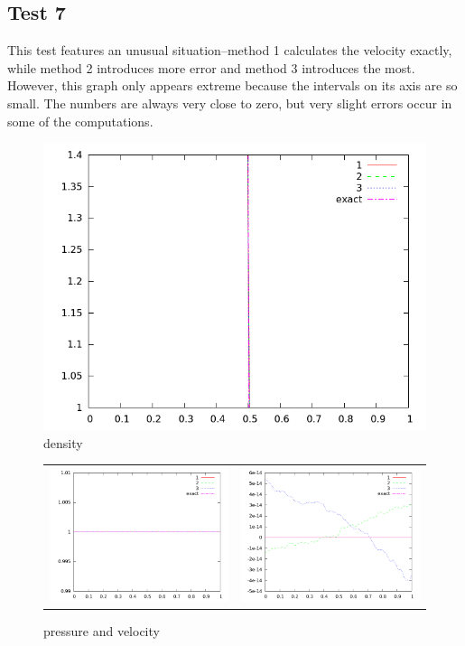 \documentclass[letterpaper,12pt]{article}
\begin{document}
\clearpage

\subsection{Test 7}
This test features an unusual situation--method 1 calculates the velocity exactly, while method 2 introduces more error and method 3 introduces the most. However, this graph only appears extreme because the intervals on its axis are so small. The numbers are always very close to zero, but very slight errors occur in some of the computations. 

\begin{figure}[h]
  \begin{center}
     \includegraphics[width=.78\textwidth]{den_T7.png}	
  \end{center}
  \caption{density}
\end{figure}

\begin{figure}
  \begin{center}
	\begin{tabular}{cc}
      \includegraphics[width=.425\textwidth]{prs_T7.png} &
	  \includegraphics[width=.425\textwidth]{vel_T7.png}
	\end{tabular}
  \end{center}
  \caption{pressure and velocity}
\end{figure}
\end{document}
